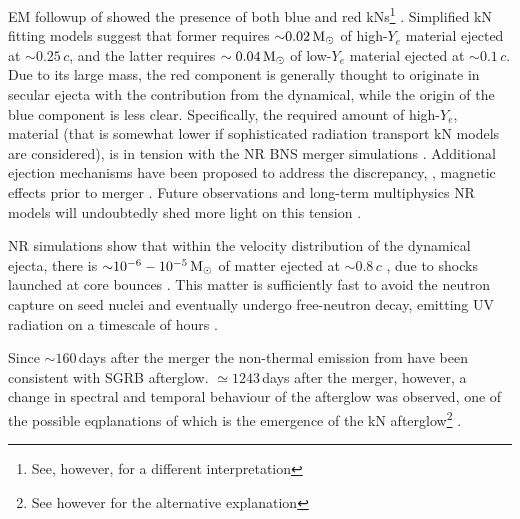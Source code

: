 \ac{EM} followup of \GW{} showed the presence of both blue and red \acp{kN}\footnote{
    See, however, \citet{Waxman:2017sqv} for a different interpretation
} \citep{Villar:2017wcc}.
Simplified \ac{kN} fitting models suggest that former requires ${\sim}0.02\,{\text{M}_{\odot}}$ of high-$Y_e$ 
material ejected at ${\sim0.25}\,c$, and the latter requires ${\sim0.04\,{\text{M}_{\odot}}}$ of low-$Y_e$ 
material ejected at ${\sim0.1}\,c$. Due to its large mass, the red component is 
generally thought to originate in secular ejecta with the contribution from the dynamical, while 
the origin of the blue component is less clear. Specifically, the required amount of high-$Y_e$,
material (that is somewhat lower if sophisticated radiation transport \ac{kN} models are considered),
is in tension with the \ac{NR} \ac{BNS} merger simulations 
\citep{Sekiguchi:2016bjd,Siegel:2019mlp,Perego:2017wtu,Kawaguchi:2018ptg}.
Additional ejection mechanisms have been proposed to address the discrepancy, \eg, 
magnetic effects prior to merger \citep{Metzger:2018qfl,Fernandez:2018kax,Radice:2018ghv}. 
Future observations and long-term multiphysics \ac{NR} models will undoubtedly shed more light on this tension \citep{Metzger:2018qfl}.

\ac{NR} simulations show that within the velocity distribution of the dynamical ejecta, 
there is ${\sim}10^{-6}-10^{-5}\,{\text{M}_{\odot}}$ of matter ejected at ${\sim}0.8\,c$ 
\citep{Metzger:2014yda,Hotokezaka:2018gmo,Radice:2018pdn,Radice:2018ghv}, due to shocks launched 
at core bounces \citep{Radice:2018pdn}.
This matter is sufficiently fast to avoid the neutron capture on seed nuclei 
and eventually undergo free-neutron decay, emitting 
\ac{UV} radiation on a timescale of hours \citep{Metzger:2014yda}. 

Since ${\sim}160\,$days after the merger the non-thermal emission from \GW{} have been 
consistent with \ac{SGRB} afterglow. ${\simeq}1243\,$days after the merger, however, a 
change in spectral and temporal behaviour of the afterglow was observed, one of the 
possible eqplanations of which is the emergence of the \ac{kN} afterglow\footnote{
    See however \citet{Troja:2021xsw} for the alternative explanation
} \citep{Hajela:2021faz}.



